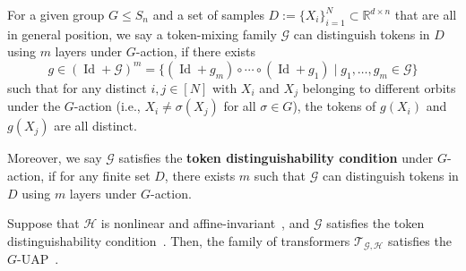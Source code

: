 \documentclass[10pt,a4paper]{amsart}
\begin{document}
\begin{definition}
    \label{def:token_distinguishability}
    For a given group $G\le S_n$ and a set of samples $D:=\{X_i\}_{i=1}^N\subset \mathbb{R}^{d\times n}$ that are all in general position, we say a token-mixing family $\mathcal G$ can distinguish tokens in $D$ using $m$ layers under $G$-action, if there exists
    \begin{equation}
        g \in (\operatorname{Id}+\mathcal{G})^m = \{(\operatorname{Id}+g_m)\circ\cdots \circ (\operatorname{Id}+g_1) \mid g_1,\dots, g_m\in \mathcal{G} \}
     \end{equation}
     such that for any distinct $i,j\in[N]$ with $X_i$ and $X_j$ belonging to different orbits under the $G$-action (i.e., $X_i\neq \sigma(X_j)$ for all $\sigma\in G$), the tokens of $g(X_i)$ and $g(X_j)$ are all distinct.

     Moreover, we say $\mathcal G$ satisfies the \textbf{token distinguishability condition} under $G$-action, if for any finite set $D$, there exists $m$ such that $\mathcal G$ can distinguish tokens in $D$ using $m$ layers under $G$-action.

\end{definition}

\begin{theorem}
    \label{thm:main}
    Suppose that $\mathcal H$ is nonlinear and affine-invariant~, and $\mathcal G$ satisfies the token distinguishability condition~. Then, the family of transformers $\mathcal{T}_{\mathcal{G}, \mathcal{H}}$ satisfies the $G$-UAP~.
\end{theorem}
\end{document}
